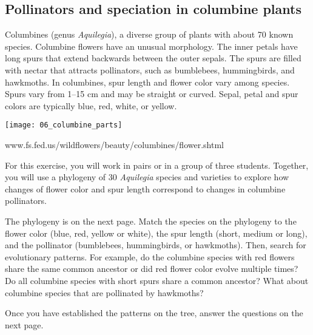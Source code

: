 \documentclass[12pt, hidelinks]{exam}
\begin{document}
\subsection*{Pollinators and speciation in columbine plants}

Columbines (genus \textit{Aquilegia}), a diverse group of plants
with about 70 known species. Columbine flowers have an unusual
morphology. The inner petals have long spurs that extend backwards
between the outer sepals. The spurs are filled with nectar that attracts
pollinators, such as bumblebees, hummingbirds, and hawkmoths. In
columbines, spur length and flower color vary among species. Spurs vary from
1–15 cm and may be straight or curved. Sepal, petal and spur colors are
typically blue, red, white, or yellow.

\begin{center}
	\texttt{[image: 06\_columbine\_parts]}

	{\footnotesize
	www.fs.fed.us/wildflowers/beauty/columbines/flower.shtml}
\end{center}

For this exercise, you will work in pairs or in a group of three students. Together,
 you will use a phylogeny of 30 \textit{Aquilegia} species and
varieties to explore how changes of flower color and spur length
correspond to changes in columbine pollinators.

The phylogeny is on the next page. Match the species on the phylogeny
 to the flower color (blue, red, yellow or white), the spur length (short, medium or long), and the
pollinator (bumblebees, hummingbirds, or hawkmoths). Then,
search for evolutionary patterns. For example, do the columbine species
with red flowers share the same common ancestor or did red flower color
evolve multiple times? Do all columbine species with short spurs share a
common ancestor? What about columbine species that are pollinated by
hawkmoths?

Once you have established the patterns on the tree, answer the questions 
on the next page.
\end{document}
